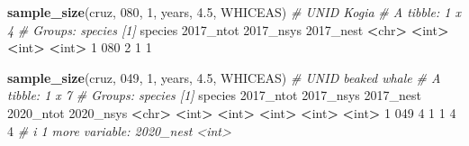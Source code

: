 \documentclass[
]{book}
\newenvironment{Shaded}{\begin{snugshade}}{\end{snugshade}}
\newcommand{\AttributeTok}[1]{\textcolor[rgb]{0.13,0.29,0.53}{#1}}
\newcommand{\CommentTok}[1]{\textcolor[rgb]{0.56,0.35,0.01}{\textit{#1}}}
\newcommand{\DecValTok}[1]{\textcolor[rgb]{0.00,0.00,0.81}{#1}}
\newcommand{\ErrorTok}[1]{\textcolor[rgb]{0.64,0.00,0.00}{\textbf{#1}}}
\newcommand{\FloatTok}[1]{\textcolor[rgb]{0.00,0.00,0.81}{#1}}
\newcommand{\FunctionTok}[1]{\textcolor[rgb]{0.13,0.29,0.53}{\textbf{#1}}}
\newcommand{\NormalTok}[1]{#1}
\newcommand{\SpecialCharTok}[1]{\textcolor[rgb]{0.81,0.36,0.00}{\textbf{#1}}}
\newcommand{\StringTok}[1]{\textcolor[rgb]{0.31,0.60,0.02}{#1}}
\begin{document}
\begin{Shaded}
\begin{Highlighting}[]
\FunctionTok{sample\_size}\NormalTok{(cruz, }\StringTok{\textquotesingle{}080\textquotesingle{}}\NormalTok{, }\DecValTok{1}\NormalTok{, years, }\FloatTok{4.5}\NormalTok{, }\StringTok{\textquotesingle{}WHICEAS\textquotesingle{}}\NormalTok{) }\CommentTok{\# UNID Kogia}
\CommentTok{\# A tibble: 1 x 4}
\CommentTok{\# Groups:   species [1]}
\NormalTok{  species }\StringTok{\textasciigrave{}}\AttributeTok{2017\_ntot}\StringTok{\textasciigrave{}} \StringTok{\textasciigrave{}}\AttributeTok{2017\_nsys}\StringTok{\textasciigrave{}} \StringTok{\textasciigrave{}}\AttributeTok{2017\_nest}\StringTok{\textasciigrave{}}
  \SpecialCharTok{\textless{}}\NormalTok{chr}\SpecialCharTok{\textgreater{}}         \ErrorTok{\textless{}}\NormalTok{int}\SpecialCharTok{\textgreater{}}       \ErrorTok{\textless{}}\NormalTok{int}\SpecialCharTok{\textgreater{}}       \ErrorTok{\textless{}}\NormalTok{int}\SpecialCharTok{\textgreater{}}
\DecValTok{1} \DecValTok{080}               \DecValTok{2}           \DecValTok{1}           \DecValTok{1}

\FunctionTok{sample\_size}\NormalTok{(cruz, }\StringTok{\textquotesingle{}049\textquotesingle{}}\NormalTok{, }\DecValTok{1}\NormalTok{, years, }\FloatTok{4.5}\NormalTok{, }\StringTok{\textquotesingle{}WHICEAS\textquotesingle{}}\NormalTok{) }\CommentTok{\# UNID beaked whale}
\CommentTok{\# A tibble: 1 x 7}
\CommentTok{\# Groups:   species [1]}
\NormalTok{  species }\StringTok{\textasciigrave{}}\AttributeTok{2017\_ntot}\StringTok{\textasciigrave{}} \StringTok{\textasciigrave{}}\AttributeTok{2017\_nsys}\StringTok{\textasciigrave{}} \StringTok{\textasciigrave{}}\AttributeTok{2017\_nest}\StringTok{\textasciigrave{}} \StringTok{\textasciigrave{}}\AttributeTok{2020\_ntot}\StringTok{\textasciigrave{}} \StringTok{\textasciigrave{}}\AttributeTok{2020\_nsys}\StringTok{\textasciigrave{}}
  \SpecialCharTok{\textless{}}\NormalTok{chr}\SpecialCharTok{\textgreater{}}         \ErrorTok{\textless{}}\NormalTok{int}\SpecialCharTok{\textgreater{}}       \ErrorTok{\textless{}}\NormalTok{int}\SpecialCharTok{\textgreater{}}       \ErrorTok{\textless{}}\NormalTok{int}\SpecialCharTok{\textgreater{}}       \ErrorTok{\textless{}}\NormalTok{int}\SpecialCharTok{\textgreater{}}       \ErrorTok{\textless{}}\NormalTok{int}\SpecialCharTok{\textgreater{}}
\DecValTok{1} \DecValTok{049}               \DecValTok{4}           \DecValTok{1}           \DecValTok{1}           \DecValTok{4}           \DecValTok{4}
\CommentTok{\# i 1 more variable: \textasciigrave{}2020\_nest\textasciigrave{} \textless{}int\textgreater{}}


\end{Highlighting}
\end{Shaded}
\end{document}
